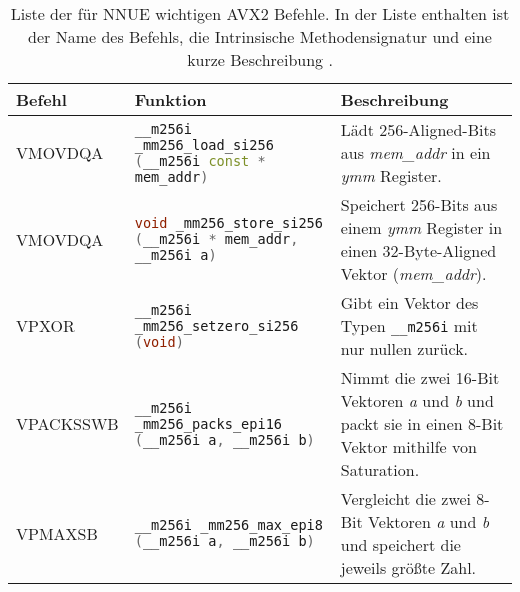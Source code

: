\begin{table}[ht]
  \caption{Liste der für \ac{NNUE} wichtigen \ac{AVX2} Befehle. In der Liste enthalten ist der Name des Befehls, die Intrinsische Methodensignatur und eine kurze Beschreibung \cite{intelIntrinsics}.}
  \label{table:nnueInstructions}
  \renewcommand{\arraystretch}{1.2}
  \centering
  \sffamily
  \begin{footnotesize}
    \begin{tabularx}{\textwidth}{l X X}
      \toprule
      \textbf{Befehl} & \textbf{Funktion}                                                                                                                                                                                    & \textbf{Beschreibung} \\
      \midrule
      VMOVDQA         & \lstinline[language=C++]{__m256i _mm256_load_si256 (__m256i const * mem_addr)} & Lädt 256-Aligned-Bits aus \emph{mem\_addr} in ein \emph{ymm} Register.                                                                                                                                                                 \\
      VMOVDQA         & \lstinline[language=C++]{void _mm256_store_si256 (__m256i * mem_addr, __m256i a)} & Speichert 256-Bits aus einem \emph{ymm} Register in einen 32-Byte-Aligned Vektor (\emph{mem\_addr}).                                                                                                                                      \\
      VPXOR           & \lstinline[language=C++]{__m256i _mm256_setzero_si256 (void)} & Gibt ein Vektor des Typen \lstinline[language=C++]{__m256i} mit nur nullen zurück.                                                                                                                                                                        \\
      VPACKSSWB       & \lstinline[language=C++]{__m256i _mm256_packs_epi16 (__m256i a, __m256i b)} & Nimmt die zwei 16-Bit Vektoren \emph{a} und \emph{b} und packt sie in einen 8-Bit Vektor mithilfe von Saturation.                                                                                                                           \\
      VPMAXSB         & \lstinline[language=C++]{__m256i _mm256_max_epi8 (__m256i a, __m256i b)}    & Vergleicht die zwei 8-Bit Vektoren \emph{a} und \emph{b} und speichert die jeweils größte Zahl.                                                                                                                                                 \\

\end{tabularx}
\end{footnotesize}
\end{table}
